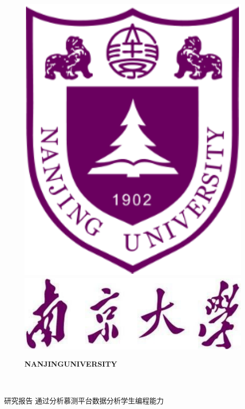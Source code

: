 \documentclass[UTF8]{ctexart}
\date{}
\begin{document}
\ttfamily \songti
{}

    \begin{figure}[t]
        \parbox[b]{2cm}{
            \includegraphics[scale=0.2]{nju.png}
            }
        \parbox[b]{9cm}{
            \begin{center}
                \includegraphics[scale=0.3]{njuname.png}
    
                \small \textbf{NANJING\quad UNIVERSITY} 
            \end{center}
            }
    \end{figure}


\begin{center}
    \quad \\
    \quad \\
    \heiti \fontsize{45}{17} 研\quad 究\quad 报\quad 告
    \vskip 3.5cm
    \heiti {} 通过分析慕测平台数据分析学生编程能力	
\end{center}
\vskip 3.5cm
\end{document}
